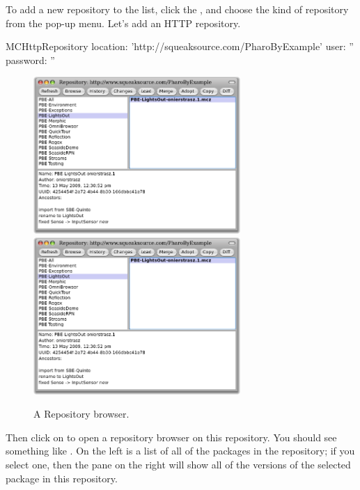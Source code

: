 \documentclass[a4paper,10pt,twoside]{book}
\begin{document}
To add a new repository to the list, click the , and choose the kind of repository from the pop-up menu.  Let's add an HTTP repository.

\begin{code}{}
MCHttpRepository
	location: 'http://squeaksource.com/PharoByExample'
	user: ''
	password: ''
\end{code}

\begin{figure}[btp]
	\begin{center}
	\ifluluelse
		{\includegraphics[width=0.7\textwidth]{SqueakSource-PBE}}
		{\includegraphics[width=0.7\textwidth]{SqueakSource-PBE}}
	\end{center}
	\caption{A Repository browser.}
\end{figure}
\noindent
Then click on  to open a repository browser on this repository.  You should see something like .  On the left is a list of all of the packages in the repository; if you select one, then the pane on the right will show all of the versions of the selected package in this repository. 
\end{document}
